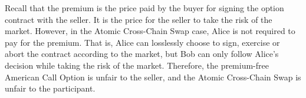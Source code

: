 Recall that the premium is the price paid by the buyer for signing the option contract with the seller.
It is the price for the seller to take the risk of the market.
However, in the Atomic Cross-Chain Swap case, Alice is not required to pay for the premium.
That is, Alice can losslessly choose to sign, exercise or abort the contract according to the market, but Bob can only follow Alice's decision while taking the risk of the market.
Therefore, the premium-free American Call Option is unfair to the seller, and the Atomic Cross-Chain Swap is unfair to the participant.

